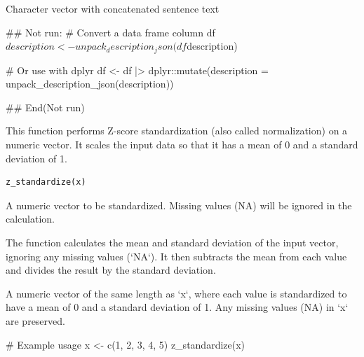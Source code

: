 \documentclass[a4paper]{book}
\begin{document}
%
\begin{Value}
Character vector with concatenated sentence text
\end{Value}
%
\begin{Examples}
\begin{ExampleCode}
## Not run: 
# Convert a data frame column
df$description <- unpack_description_json(df$description)

# Or use with dplyr
df <- df |> dplyr::mutate(description = unpack_description_json(description))

## End(Not run)

\end{ExampleCode}
\end{Examples}
%
\begin{Description}
This function performs Z-score standardization (also called normalization) on a numeric vector. 
It scales the input data so that it has a mean of 0 and a standard deviation of 1.
\end{Description}
%
\begin{Usage}
\begin{verbatim}
z_standardize(x)
\end{verbatim}
\end{Usage}
%
\begin{Arguments}
\begin{ldescription}
\item[\code{x}] A numeric vector to be standardized. Missing values (NA) will be ignored in the calculation.
\end{ldescription}
\end{Arguments}
%
\begin{Details}
The function calculates the mean and standard deviation of the input vector, ignoring any 
missing values (`NA`). It then subtracts the mean from each value and divides the result by the standard deviation.
\end{Details}
%
\begin{Value}
A numeric vector of the same length as `x`, where each value is standardized to have a mean of 0 
and a standard deviation of 1. Any missing values (NA) in `x` are preserved.
\end{Value}
%
\begin{Examples}
\begin{ExampleCode}
# Example usage
x <- c(1, 2, 3, 4, 5)
z_standardize(x)

\end{ExampleCode}
\end{Examples}
\printindex{}
\end{document}
